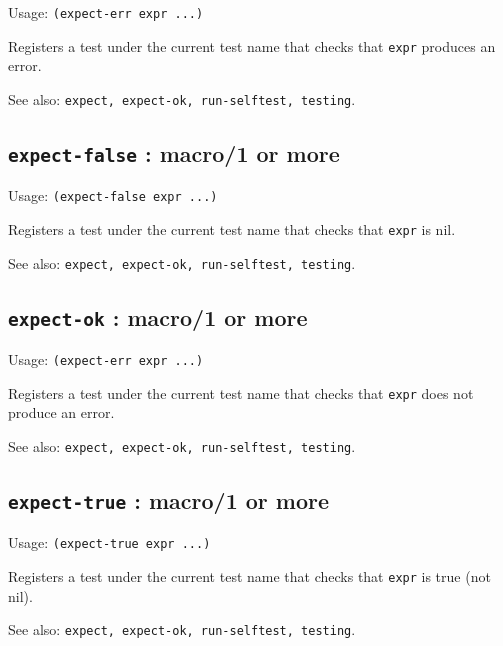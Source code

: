 \documentclass[
]{article}
\newcommand{\passthrough}[1]{#1}
\begin{document}
Usage: \passthrough{\lstinline!(expect-err expr ...)!}

Registers a test under the current test name that checks that
\passthrough{\lstinline!expr!} produces an error.

See also:
\passthrough{\lstinline!expect, expect-ok, run-selftest, testing!}.

\hypertarget{expect-false-macro1-or-more-1}{%
\subsection{\texorpdfstring{\texttt{expect-false} : macro/1 or
more}{expect-false : macro/1 or more}}\label{expect-false-macro1-or-more-1}}

Usage: \passthrough{\lstinline!(expect-false expr ...)!}

Registers a test under the current test name that checks that
\passthrough{\lstinline!expr!} is nil.

See also:
\passthrough{\lstinline!expect, expect-ok, run-selftest, testing!}.

\hypertarget{expect-ok-macro1-or-more-1}{%
\subsection{\texorpdfstring{\texttt{expect-ok} : macro/1 or
more}{expect-ok : macro/1 or more}}\label{expect-ok-macro1-or-more-1}}

Usage: \passthrough{\lstinline!(expect-err expr ...)!}

Registers a test under the current test name that checks that
\passthrough{\lstinline!expr!} does not produce an error.

See also:
\passthrough{\lstinline!expect, expect-ok, run-selftest, testing!}.

\hypertarget{expect-true-macro1-or-more-1}{%
\subsection{\texorpdfstring{\texttt{expect-true} : macro/1 or
more}{expect-true : macro/1 or more}}\label{expect-true-macro1-or-more-1}}

Usage: \passthrough{\lstinline!(expect-true expr ...)!}

Registers a test under the current test name that checks that
\passthrough{\lstinline!expr!} is true (not nil).

See also:
\passthrough{\lstinline!expect, expect-ok, run-selftest, testing!}.
\end{document}
